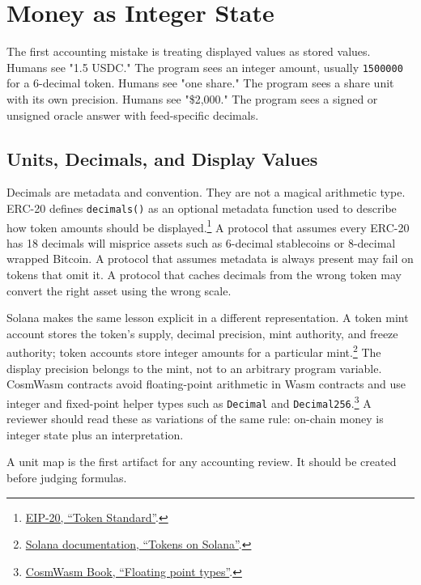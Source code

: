 \section{Money as Integer State}

The first accounting mistake is treating displayed values as stored values. Humans see "1.5 USDC." The program sees an integer amount, usually \texttt{1500000} for a 6-decimal token. Humans see "one share." The program sees a share unit with its own precision. Humans see "\$2,000." The program sees a signed or unsigned oracle answer with feed-specific decimals.

\subsection{Units, Decimals, and Display Values}

Decimals are metadata and convention. They are not a magical arithmetic type. ERC-20 defines \texttt{decimals()} as an optional metadata function used to describe how token amounts should be displayed.\footnote{\href{https://eips.ethereum.org/EIPS/eip-20}{EIP-20, ``Token Standard''}.} A protocol that assumes every ERC-20 has 18 decimals will misprice assets such as 6-decimal stablecoins or 8-decimal wrapped Bitcoin. A protocol that assumes metadata is always present may fail on tokens that omit it. A protocol that caches decimals from the wrong token may convert the right asset using the wrong scale.

Solana makes the same lesson explicit in a different representation. A token mint account stores the token's supply, decimal precision, mint authority, and freeze authority; token accounts store integer amounts for a particular mint.\footnote{\href{https://solana.com/docs/tokens}{Solana documentation, ``Tokens on Solana''}.} The display precision belongs to the mint, not to an arbitrary program variable. CosmWasm contracts avoid floating-point arithmetic in Wasm contracts and use integer and fixed-point helper types such as \texttt{Decimal} and \texttt{Decimal256}.\footnote{\href{https://book.cosmwasm.com/basics/fp-types.html}{CosmWasm Book, ``Floating point types''}.} A reviewer should read these as variations of the same rule: on-chain money is integer state plus an interpretation.

\begin{artifactbox}
A unit map is the first artifact for any accounting review. It should be created before judging formulas.
\end{artifactbox}

